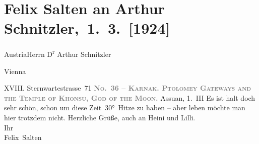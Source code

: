 

         
         \renewcommand{\erwaehntePersonen}{Personen: Felix Salten, Heinrich Schnitzler, Lilly Schnitzler}
         \renewcommand{\erwaehnteOrte}{Orte: Assuan, Karnak Tempelanlage, Old Cataract Hotel, Sternwartestraße 71, Wien, Österreich}
         \renewcommand{\erwaehnteWerke}{}
               \section[ Felix Salten an Arthur Schnitzler, 1. 3. {[}1924{]}]{ Felix Salten an Arthur Schnitzler, 1. 3. {[}1924{]}}\nopagebreak{}\rehead{ }\begin{ledgroupsized}[t]{13cm}\normalsize\beginnumbering{} \toendnotes[C]{\smallbreak\pagebreak[2]} 
\pstart{}{\pb}Austria\pend{}\pstart{}Herrn D\textsuperscript{r} Arthur Schnitzler\pend{}\pstart{}\begin{otherlanguage}{english}Vienna\end{otherlanguage}\pend{}\pstart{}XVIII. Sternwartestrasse 71\pend{}{\bigskip}\pstart
           \noindent{}{\pb}\textcolor{gray}{\textbf{\textsc{No. 36 – Karnak. Ptolomey Gateways and the Temple of Khonsu, God
                           of the Moon}.}}\pend
           \pstart
           \raggedleft{}{\pb}Assuan, 1. III\pend
           \pstart
           Es ist halt doch sehr schön, schon um diese Zeit 30° Hitze zu haben – aber leben
               möchte man hier trotzdem nicht. Herzliche Grüße, auch an Heini und Lilli.
               {\\}Ihr {\\}\spacefill\mbox{Felix Salten}\pend
           
         
         \endnumbering{}\end{ledgroupsized}  \newcommand{\dateiname}{L03594}\newcommand{\titel}{Felix Salten an Arthur Schnitzler, 1. 3. [1924]}\newcommand{\editorInnen}{Martin Anton Müller und Laura Untner}
      